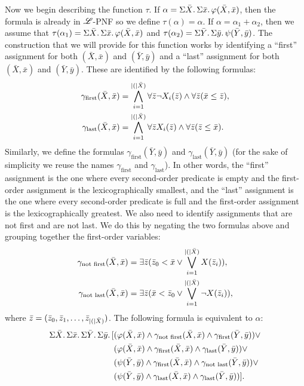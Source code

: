 Now we begin describing the function $\tau$. If $\alpha = \Sigma{\bar{X}}.\,\Sigma{\bar{x}}.\,\varphi(\bar{X},\bar{x})$, then the formula is already in $\mathscr{L}$-PNF so we define $\tau(\alpha) = \alpha$. If $\alpha = \alpha_1 + \alpha_2$, then we assume that $\tau(\alpha_1) = \Sigma{\bar{X}}.\,\Sigma{\bar{x}}.\,\varphi(\bar{X},\bar{x})$ and $\tau(\alpha_2) = \Sigma{\bar{Y}}.\,\Sigma{\bar{y}}.\,\psi(\bar{Y},\bar{y})$. The construction that we will provide for this function works by identifying a ``first'' assignment for both $(\bar{X},\bar{x})$ and $(\bar{Y},\bar{y})$ and a ``last'' assignment for both $(\bar{X},\bar{x})$ and $(\bar{Y},\bar{y})$. These are identified by the following formulas:
\begin{align*}
\gamma_{\text{first}}(\bar{X},\bar{x}) &= \bigwedge_{i = 1}^{\vert ( \vert\bar{X})} \forall\bar{z}\neg X_i(\bar{z}) \wedge \forall\bar{z}(\bar{x}\leq\bar{z}), \\
\gamma_{\text{last}}(\bar{X},\bar{x}) &= \bigwedge_{i = 1}^{\vert ( \vert\bar{X})} \forall\bar{z} X_i(\bar{z}) \wedge \forall\bar{z}(\bar{z}\leq\bar{x}).
\end{align*}
Similarly, we define the formulas $\gamma_{\text{first}}(\bar{Y},\bar{y})$ and $\gamma_{\text{last}}(\bar{Y},\bar{y})$ (for the sake of simplicity we reuse the names $\gamma_{\text{first}}$ and $\gamma_{\text{last}}$).
In other words, the ``first'' assignment is the one where every second-order predicate is empty and the first-order assignment is the lexicographically smallest, and the ``last'' assignment is the one where every second-order predicate is full and the first-order assignment is the lexicographically greatest. We also need to identify assignments that are not first and are not last. We do this by negating the two formulas above and grouping together the first-order variables:
\begin{align*}
\gamma_{\text{not first}}(\bar{X},\bar{x}) &= \exists\bar{z}(\bar{z}_0 < \bar{x} \vee \bigvee_{i = 1}^{\vert ( \vert\bar{X})}X(\bar{z}_i)), \\
\gamma_{\text{not last}}(\bar{X},\bar{x}) &= \exists\bar{z}(\bar{x} < \bar{z}_0 \vee \bigvee_{i = 1}^{\vert ( \vert\bar{X})}\neg X(\bar{z}_i)),
\end{align*}
where $\bar{z} = (\bar{z}_0,\bar{z}_1,\ldots,\bar{z}_{\vert ( \vert\bar{X})})$. The following formula is equivalent to $\alpha$:
\begin{align}
\sa{\bar{X}}\sa{\bar{x}}\sa{\bar{Y}}\sa{\bar{y}}[&(\varphi(\bar{X},\bar{x})\wedge\gamma_{\text{not first}}(\bar{X},\bar{x})\wedge\gamma_{\text{first}}(\bar{Y},\bar{y}))\vee \label{eq:partition1} \\
&(\varphi(\bar{X},\bar{x})\wedge\gamma_{\text{first}}(\bar{X},\bar{x})\wedge\gamma_{\text{last}}(\bar{Y},\bar{y}))\vee \label{eq:partition2}\\
&(\psi(\bar{Y},\bar{y})\wedge\gamma_{\text{first}}(\bar{X},\bar{x})\wedge\gamma_{\text{not last}}(\bar{Y},\bar{y}))\vee \label{eq:partition3}\\
&(\psi(\bar{Y},\bar{y})\wedge\gamma_{\text{last}}(\bar{X},\bar{x})\wedge\gamma_{\text{last}}(\bar{Y},\bar{y}))]. \label{eq:partition4}
\end{align}
